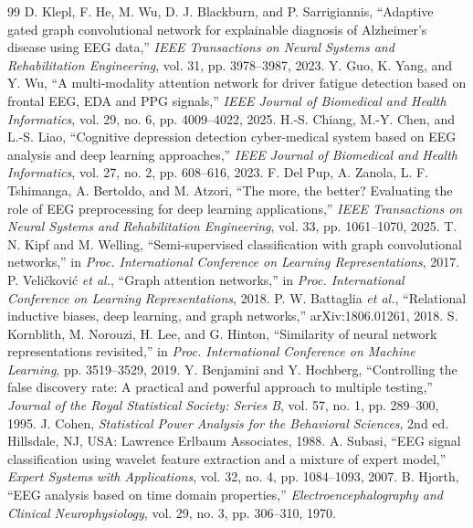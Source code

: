 \documentclass[journal]{IEEEtran}
\begin{document}
\begin{thebibliography}{99}
 D. Klepl, F. He, M. Wu, D. J. Blackburn, and P. Sarrigiannis, ``Adaptive gated graph convolutional network for explainable diagnosis of Alzheimer's disease using EEG data,'' \emph{IEEE Transactions on Neural Systems and Rehabilitation Engineering}, vol. 31, pp. 3978--3987, 2023.
 Y. Guo, K. Yang, and Y. Wu, ``A multi-modality attention network for driver fatigue detection based on frontal EEG, EDA and PPG signals,'' \emph{IEEE Journal of Biomedical and Health Informatics}, vol. 29, no. 6, pp. 4009--4022, 2025.
 H.-S. Chiang, M.-Y. Chen, and L.-S. Liao, ``Cognitive depression detection cyber-medical system based on EEG analysis and deep learning approaches,'' \emph{IEEE Journal of Biomedical and Health Informatics}, vol. 27, no. 2, pp. 608--616, 2023.
 F. Del Pup, A. Zanola, L. F. Tshimanga, A. Bertoldo, and M. Atzori, ``The more, the better? Evaluating the role of EEG preprocessing for deep learning applications,'' \emph{IEEE Transactions on Neural Systems and Rehabilitation Engineering}, vol. 33, pp. 1061--1070, 2025.
 T. N. Kipf and M. Welling, ``Semi-supervised classification with graph convolutional networks,'' in \emph{Proc. International Conference on Learning Representations}, 2017.
 P. Veli\v{c}kovi\'{c} \emph{et al.}, ``Graph attention networks,'' in \emph{Proc. International Conference on Learning Representations}, 2018.
 P. W. Battaglia \emph{et al.}, ``Relational inductive biases, deep learning, and graph networks,'' arXiv:1806.01261, 2018.
 S. Kornblith, M. Norouzi, H. Lee, and G. Hinton, ``Similarity of neural network representations revisited,'' in \emph{Proc. International Conference on Machine Learning}, pp. 3519--3529, 2019.
 Y. Benjamini and Y. Hochberg, ``Controlling the false discovery rate: A practical and powerful approach to multiple testing,'' \emph{Journal of the Royal Statistical Society: Series B}, vol. 57, no. 1, pp. 289--300, 1995.
 J. Cohen, \emph{Statistical Power Analysis for the Behavioral Sciences}, 2nd ed. Hillsdale, NJ, USA: Lawrence Erlbaum Associates, 1988.
 A. Subasi, ``EEG signal classification using wavelet feature extraction and a mixture of expert model,'' \emph{Expert Systems with Applications}, vol. 32, no. 4, pp. 1084--1093, 2007.
 B. Hjorth, ``EEG analysis based on time domain properties,'' \emph{Electroencephalography and Clinical Neurophysiology}, vol. 29, no. 3, pp. 306--310, 1970.

\end{thebibliography}
\end{document}
